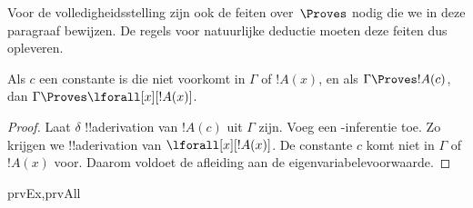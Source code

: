\documentclass[openany]{memoir}
\begin{document}
\begingroup
\def\olfilename{OLP-0094}
\def\olfilepath{content/first-order-logic/natural-deduction/}
\hypertarget{unit-OLP-0094}{}






\begin{explain}
  Voor de volledigheidsstelling zijn ook de feiten over~$\Proves$
  nodig die we in deze paragraaf bewijzen. De regels voor natuurlijke
  deductie moeten deze feiten dus opleveren.
\end{explain}

\begin{thm}
 Als $c$ een constante is die niet
voorkomt in $\Gamma$ of $!A(x)$, en als $\Gamma \Proves !A(c)$, dan
$\Gamma
\Proves \lforall[x][!A(x)]$.
\end{thm}

\begin{proof}
Laat $\delta$ !!a{derivation} van $!A(c)$ uit $\Gamma$ zijn. Voeg een
\Intro{\lforall}-inferentie toe. Zo krijgen we !!a{derivation} van
$\lforall[x][!A(x)]$. De constante $c$ komt niet in $\Gamma$ of
$!A(x)$ voor. Daarom voldoet de afleiding aan de
eigenvariabelevoorwaarde.
\end{proof}

\begin{prop}
\begin{tagenumerate}{prvEx,prvAll}

\end{tagenumerate}
\end{prop}
\end{document}
